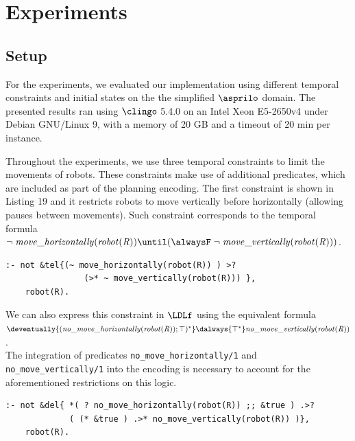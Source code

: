 \section{Experiments  }

\subsection{Setup}

For the experiments, we evaluated our implementation using different temporal constraints and initial states on the the simplified $\asprilo$ domain. The presented results ran using $\clingo$ 5.4.0 on an Intel Xeon E5-2650v4 under Debian GNU/Linux 9, with a memory of 20 GB and a timeout of 20 min per instance.

Throughout the experiments, we use three temporal constraints to limit the movements of robots. These constraints make use of additional predicates, which are included as part of the planning encoding. The first constraint is shown in Listing 19 and it restricts robots to move vertically before horizontally (allowing pauses between movements). Such constraint corresponds to the temporal formula $\neg\; \mathit{move\_horizontally(robot(R))} \until (\alwaysF \;\neg \;\mathit{move\_vertically(robot(R)))}$.

\begin{center}
    \begin{lstlisting}[] 
:- not &tel{(~ move_horizontally(robot(R)) ) >? 
                (>* ~ move_vertically(robot(R))) },
    robot(R).
    \end{lstlisting}
\end{center}

We can also express this constraint in $\LDLf$ using the equivalent formula \\ $\deventually{ (\mathit{no\_move\_horizontally(robot(R))} ; \top)^\ast} \dalways{\top^\ast} \mathit{no\_move\_vertically(robot(R))}$. \\The integration of predicates \texttt{no\_move\_horizontally/1} and \texttt{no\_move\_vertically/1} into the encoding is necessary to account for the aforementioned restrictions on this logic.

\begin{center}
    \begin{lstlisting}[] 
:- not &del{ *( ? no_move_horizontally(robot(R)) ;; &true ) .>? 
             ( (* &true ) .>* no_move_vertically(robot(R)) )}, 
    robot(R).
    \end{lstlisting}
\end{center}


